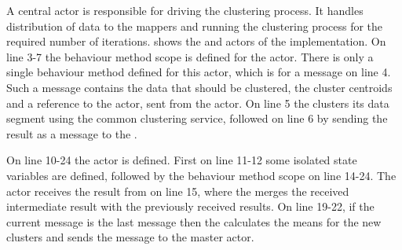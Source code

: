 


A central  actor is responsible for driving the clustering process. It handles distribution of data to the mappers and running the clustering process for the required number of iterations.  shows the  and  actors of the implementation. On line 3-7 the behaviour method scope is defined for the  actor. There is only a single behaviour method defined for this actor, which is for a  message on line 4. Such a message contains the data that should be clustered, the cluster centroids and a reference to the  actor, sent from the  actor. On line 5 the  clusters its data segment using the common clustering service, followed on line 6 by sending the result as a  message to the .

On line 10-24 the  actor is defined. First on line 11-12 some isolated state variables are defined, followed by the behaviour method scope on line 14-24.
The  actor receives the result from  on line 15, where the  merges the received intermediate result with the previously received results. On line 19-22, if the current message is the last message then the  calculates the means for the new clusters and sends the  message to the master actor.

